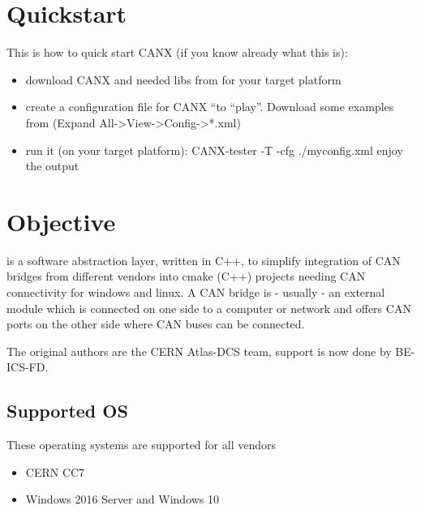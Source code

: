 \documentclass[letterpaper,10pt,english]{sphinxmanual}
\begin{document}
\chapter{Quickstart}
\label{\detokenize{quickstart:quickstart}}\label{\detokenize{quickstart::doc}}
This is how to quick start CANX (if you know already what this is):
\begin{itemize}
\item {} 
download CANX and needed libs from  for your target platform

\item {} 
create a configuration file for CANX “to “play”. Download some examples from 
(Expand All-\textgreater{}View-\textgreater{}Config-\textgreater{}*.xml)

\item {} 
run it (on your target platform): CANX-tester -T -cfg ./myconfig.xml
enjoy the output

\end{itemize}
\begin{quote}
\end{quote}


\chapter{Objective}
\label{\detokenize{objective:objective}}\label{\detokenize{objective::doc}}
 is a software abstraction layer, written in C++, to simplify integration
of CAN bridges from different vendors into cmake (C++) projects needing CAN connectivity
for windows and linux. A CAN bridge is - usually - an external module which is connected
on one side to a computer or network and offers CAN ports on the other side where CAN buses
can be connected.

The original authors are the CERN Atlas-DCS team, support is now done by BE-ICS-FD.


\section{Supported OS}
\label{\detokenize{objective:supported-os}}
These operating systems are supported for all vendors
\begin{itemize}
\item {} 
CERN CC7

\item {} 
Windows 2016 Server and Windows 10

\end{itemize}
\end{document}
